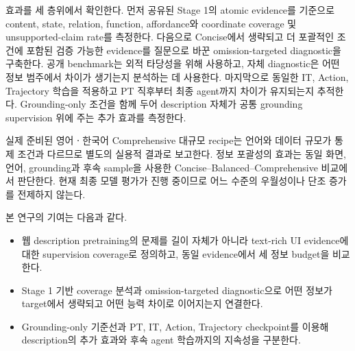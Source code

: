효과를 세 층위에서 확인한다. 먼저 공유된 Stage 1의 atomic
evidence를 기준으로 content, state, relation, function,
affordance와 coordinate coverage 및 unsupported-claim rate를
측정한다. 다음으로 Concise에서 생략되고 더 포괄적인 조건에
포함된 검증 가능한 evidence를 질문으로 바꾼 omission-targeted
diagnostic을 구축한다. 공개 benchmark는 외적 타당성을 위해
사용하고, 자체 diagnostic은 어떤 정보 범주에서 차이가 생기는지
분석하는 데 사용한다. 마지막으로 동일한 IT, Action, Trajectory
학습을 적용하고 PT 직후부터 최종 agent까지 차이가 유지되는지
추적한다. Grounding-only 조건을 함께 두어 description 자체가
공통 grounding supervision 위에 주는 추가 효과를 측정한다.

실제 준비된 영어ㆍ한국어 Comprehensive 대규모 recipe는 언어와
데이터 규모가 통제 조건과 다르므로 별도의 실용적 결과로 보고한다.
정보 포괄성의 효과는 동일 화면, 언어, grounding과 후속 sample을
사용한 Concise--Balanced--Comprehensive 비교에서 판단한다. 현재
최종 모델 평가가 진행 중이므로 어느 수준의 우월성이나 단조 증가를
전제하지 않는다.

본 연구의 기여는 다음과 같다.
\begin{itemize}
    \item 웹 description pretraining의 문제를 길이 자체가 아니라
    text-rich UI evidence에 대한 supervision coverage로 정의하고,
    동일 evidence에서 세 정보 budget을 비교한다.
    \item Stage 1 기반 coverage 분석과 omission-targeted
    diagnostic으로 어떤 정보가 target에서 생략되고 어떤 능력
    차이로 이어지는지 연결한다.
    \item Grounding-only 기준선과 PT, IT, Action, Trajectory
    checkpoint를 이용해 description의 추가 효과와 후속 agent
    학습까지의 지속성을 구분한다.
\end{itemize}
